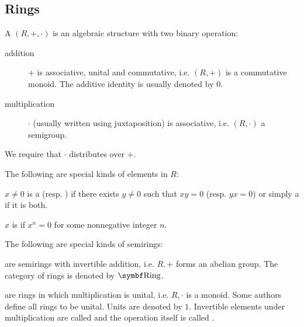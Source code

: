 \subsection{Rings}\label{subsec:rings}

\begin{definition}\label{def:semiring}
  A  \( (R, +, \cdot) \) is an algebraic structure with two binary operation:
  \begin{description}
    \item[addition] \( + \) is associative, unital and commutative, i.e. \( (R, +) \) is a commutative monoid. The additive identity is usually denoted by \( 0 \).

    \item[multiplication] \( \cdot \) (usually written using juxtaposition) is associative, i.e. \( (R, \cdot) \) a semigroup.
  \end{description}

  We require that \( \cdot \) distributes over \( + \).

  The following are special kinds of elements in \( R \):
  \begin{defenum}
     \( x \neq 0 \) is a  (resp. ) if there exists \( y \neq 0 \) such that \( xy = 0 \) (resp. \( yx = 0 \)) or simply a  if it is both.

     \( x \) is  if \( x^n = 0 \) for some nonnegative integer \( n \).
  \end{defenum}

  The following are special kinds of semirings:
  \begin{defenum}
      are semirings with invertible addition, i.e. \( R, + \) forms an abelian group. The category of rings is denoted by \( \Cat{Ring} \).

      are rings in which multiplication is unital, i.e. \( R, \cdot \) is a monoid. Some authors define all rings to be unital. Units are denoted by \( 1 \). Invertible elements under multiplication are called  and the operation itself is called .



\end{defenum}
\end{definition}
